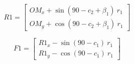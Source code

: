 \documentclass[10pt,a4paper]{article}
\begin{document}
\begin{multicols}{2}
\begin{equation}
R1 = \begin{bmatrix}
OM_x + \sin(90-c_2+\beta_1)~r_1 \\
OM_y + \cos(90-c_2+\beta_1)~r_1
\end{bmatrix}
\end{equation}


\begin{equation}
F1 = \begin{bmatrix}
R1_x - \sin(90-c_1)~r_1 \\
R1_y - \cos(90-c_1)~r_1
\end{bmatrix}
\label{eq:F2_end}
\end{equation}

\end{multicols}
\end{document}
